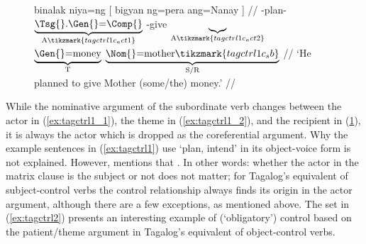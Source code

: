 \begin{figure}
\a\label{ex:tagctrl1_3}\begingl[aboveglbskip=1.5em, aboveglftskip=1.75em]
	\gla binalak niya=ng \textup{[} bigyan {} ng=pera ang=Nanay \textup{]} //
	\glb \Pfv{}-plan-\Ov{}
		$\underbrace{\text{\smash{\Tsg{}}.\Gen{}=\Comp{}}}_{\text{A}%
			\tikzmark{tagctrl1c_act1}%
		}$
		{}
		\Dv{}-give%
		$\underbrace{}_{\text{A}%
			\tikzmark{tagctrl1c_act2}%
		}$
		$\underbrace{\text{\Gen{}=\smash{money}}}_{\text{T}}$
		$\underbrace{\text{\Nom{}=mother}%
			\tikzmark{tagctrl1c_sb}%
		}_{\text{S/R}}$
		{} //
	\glft `He planned to give Mother (some/the) money.' //
\endgl
{}

\xe
\end{figure}

While the nominative argument of the subordinate verb changes between the actor
in (\ref{ex:tagctrl1_1}), the theme in (\ref{ex:tagctrl1_2}), and the recipient
in (\ref{ex:tagctrl1_3}), it is always the actor which is dropped as the
coreferential argument. Why the example sentences in (\ref{ex:tagctrl1}) use
 `plan, intend' in its object-voice form is not explained. However,
\citet{kroeger1991} mentions that . In other words: whether the actor in the
matrix clause is the subject or not does not matter; for Tagalog's equivalent
of subject-control verbs the control relationship always finds its origin in
the actor argument, although there are a few exceptions, as mentioned above.
The set in (\ref{ex:tagctrl2}) presents an interesting example of
(`obligatory') control based on the patient/theme argument in Tagalog's
equivalent of object-control verbs.

